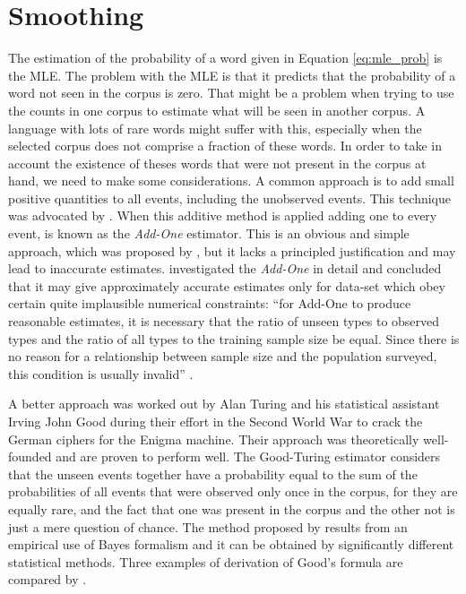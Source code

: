 \section{Smoothing}
The estimation of the probability of a word given in Equation \ref{eq:mle_prob} is the MLE.
The problem with the MLE is that it predicts that the probability of a word not seen in the corpus
is zero. That might be a problem when trying to use the counts in one corpus to estimate what will
be seen in another corpus. A language with lots of rare words might suffer with this, especially
when the selected corpus does not comprise a fraction of these words. In order to take in account 
the existence of theses words that were not present in the corpus at hand, we need to make some 
considerations. 
A common approach is to add small positive quantities to all events, including the unobserved events. 
This technique was advocated by \cite{Lidstone1920, Johnson1932,jeffreys1939theory}.
When this additive method is applied adding one to every event, is known as the \textit{Add-One} estimator.
This is an obvious and simple approach, which was proposed by \cite{laplace}, 
but it lacks a principled justification and may lead to
inaccurate estimates.
\cite{Gale94} investigated the \textit{Add-One} in detail and concluded that it may give approximately
accurate estimates only for data-set which obey certain quite implausible numerical constraints:
``for Add-One to produce reasonable estimates, it is necessary that the ratio of unseen types to
observed types and the ratio of all types to the training sample size be equal. Since there is no reason for a
relationship between sample size and the population surveyed, this condition is usually invalid'' \citep{Gale94}.


A better approach was worked out by Alan Turing and his statistical assistant 
Irving John Good during their effort in the Second World War to crack the German ciphers for the Enigma machine.
Their approach was theoretically well-founded and are proven to perform well.
The Good-Turing estimator \citep{Good1953} considers that the unseen events
together have a probability equal to the sum of the probabilities of all events that were observed
only once in the corpus, for they are equally rare, and the fact that one was present in the corpus
and the other not is just a mere question of chance.
The method proposed by \cite{Good1953} results from an empirical use of Bayes formalism
and it can be obtained by significantly different statistical methods. Three examples of derivation
of Good's formula are compared by \cite{nadas1985}.


